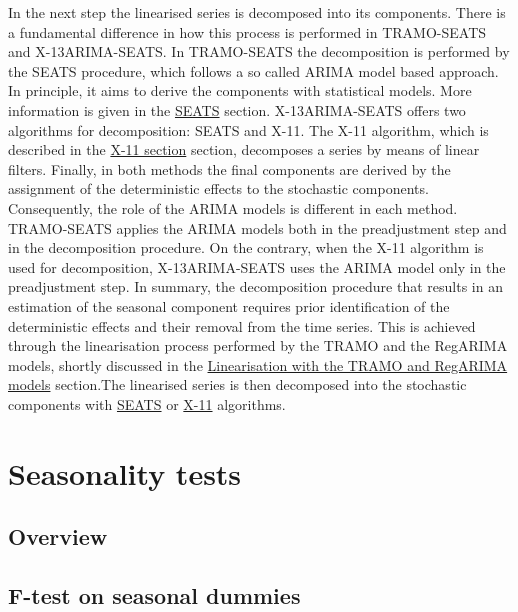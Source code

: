 \documentclass[
  letterpaper,
  DIV=11,
  numbers=noendperiod]{scrreprt}
\begin{document}
In the next step the linearised series is decomposed into its
components. There is a fundamental difference in how this process is
performed in TRAMO-SEATS and X-13ARIMA-SEATS. In TRAMO-SEATS the
decomposition is performed by the SEATS procedure, which follows a so
called ARIMA model based approach. In principle, it aims to derive the
components with statistical models. More information is given in the
\href{../theory/SA_SEATS.html}{SEATS} section. X-13ARIMA-SEATS offers
two algorithms for decomposition: SEATS and X-11. The X-11 algorithm,
which is described in the \href{../theory/SA_X11.html}{X-11 section}
section, decomposes a series by means of linear filters. Finally, in
both methods the final components are derived by the assignment of the
deterministic effects to the stochastic components. Consequently, the
role of the ARIMA models is different in each method. TRAMO-SEATS
applies the ARIMA models both in the preadjustment step and in the
decomposition procedure. On the contrary, when the X-11 algorithm is
used for decomposition, X-13ARIMA-SEATS uses the ARIMA model only in the
preadjustment step. In summary, the decomposition procedure that results
in an estimation of the seasonal component requires prior identification
of the deterministic effects and their removal from the time series.
This is achieved through the linearisation process performed by the
TRAMO and the RegARIMA models, shortly discussed in the
\href{../theory/SA_lin.html}{Linearisation with the TRAMO and RegARIMA
models} section.The linearised series is then decomposed into the
stochastic components with \href{../theory/SA_SEATS.html}{SEATS} or
\href{../theory/SA_X11.html}{X-11} algorithms.

\hypertarget{seasonality-tests}{%
\section{Seasonality tests}\label{seasonality-tests}}

\hypertarget{overview}{%
\subsection{Overview}\label{overview}}

\hypertarget{f-test-on-seasonal-dummies}{%
\subsection{F-test on seasonal
dummies}\label{f-test-on-seasonal-dummies}}
\end{document}
